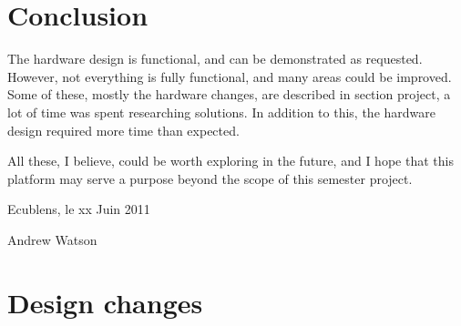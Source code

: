 

\section{Conclusion}


The hardware design is functional, and can be demonstrated as requested.
However, not everything is fully functional, and many areas could be improved.
Some of these, mostly the hardware changes, are described in section
project, a lot of time was spent researching solutions. In addition to this, the
hardware design required more time than expected.

All these, I believe, could be worth exploring in the future, and I hope that
this platform may serve a purpose beyond the scope of this semester project.

\vspace{3cm}
Ecublens, le xx Juin 2011

\vspace{2cm}
Andrew Watson



\pagebreak



\pagebreak
\appendix

\section{Design changes}
\label{sec:design-changes}


